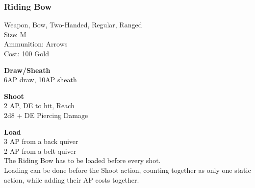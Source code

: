 \subsubsection{Riding Bow}\label{weapon:ridingBow}
Weapon, Bow, Two-Handed, Regular, Ranged\\
Size: M\\
Ammunition: Arrows\\
Cost: 100 Gold

\textbf{Draw/Sheath}\\
6AP draw, 10AP sheath

\textbf{Shoot}\\
2 AP, DE to hit,  Reach\\
2d8 + \texttimes DE Piercing Damage

\textbf{Load}\\
3 AP from a back quiver\\
2 AP from a belt quiver\\
The Riding Bow has to be loaded before every shot.\\
Loading can be done before the Shoot action, counting together as only one static action, while adding their AP costs together.

